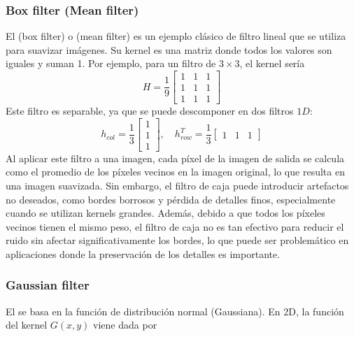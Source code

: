 \subsubsection{Box filter (Mean filter)}
\noindent
El  (box filter) o  (mean filter) es un ejemplo clásico de filtro lineal que se utiliza para suavizar imágenes. Su kernel es una matriz donde todos los valores son iguales y suman 1. Por ejemplo, para un filtro de $3 \times 3$, el kernel sería
$$H = \frac{1}{9} \begin{bmatrix}
1 & 1 & 1 \\
1 & 1 & 1 \\
1 & 1 & 1
\end{bmatrix}$$
Este filtro es separable, ya que se puede descomponer en dos filtros $1D$:
\begin{equation*}
    h_{col} = \frac{1}{3} \begin{bmatrix}
1 \\
1 \\
1
\end{bmatrix}, \quad h_{row}^T = \frac{1}{3} \begin{bmatrix}
1 & 1 & 1
\end{bmatrix}
\end{equation*}
Al aplicar este filtro a una imagen, cada píxel de la imagen de salida se calcula como el promedio de los píxeles vecinos en la imagen original, lo que resulta en una imagen suavizada. Sin embargo, el filtro de caja puede introducir artefactos no deseados, como bordes borrosos y pérdida de detalles finos, especialmente cuando se utilizan kernels grandes. Además, debido a que todos los píxeles vecinos tienen el mismo peso, el filtro de caja no es tan efectivo para reducir el ruido sin afectar significativamente los bordes, lo que puede ser problemático en aplicaciones donde la preservación de los detalles es importante.

\subsubsection{Gaussian filter}
\noindent
El  se basa en la función de distribución normal (Gaussiana). En 2D, la función del kernel $G(x, y)$ viene dada por

